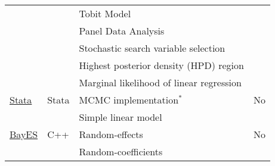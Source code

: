 \begin{table}[!ht]
{{\begin{tabular}{|l|l|l|c|}
                                                                 &                                              & Tobit Model                                                                  &                                                                     \\
                                                                 &                                              & Panel Data Analysis                                                          &                                                                     \\
                                                                 &                                              & Stochastic search variable selection                                         &                                                                     \\
                                                                 &                                              & Highest posterior density (HPD) region                                       &                                                                     \\
                                                                 &                                              & Marginal likelihood of linear regression                               &                                                                     \\ \hline
\href{https://www.stata.com/manuals14/bayes.pdf}{Stata}                                                            & Stata                                        & MCMC implementation$^*$ & No                                                   \\ \hline
\multirow{16}{*}{\href{http://www.bayeconsoft.com/}{BayES}}                                          & \multirow{16}{*}{C++}                        & Simple linear model                                                          & \multirow{16}{*}{No} \\
                                                                 &                                              & Random-effects                                                         &                                                                     \\
                                                                 &                                              & Random-coefficients                                                     &                                                                     \\

\end{tabular}}}
\end{table}
